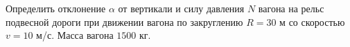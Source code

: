 Определить отклонение $\alpha$ от вертикали и силу давления $N$ вагона
на рельс подвесной дороги при движении вагона по закруглению $R = 30$ м
со скоростью $v = 10$ м/с.
Масса вагона $1500$ кг.
